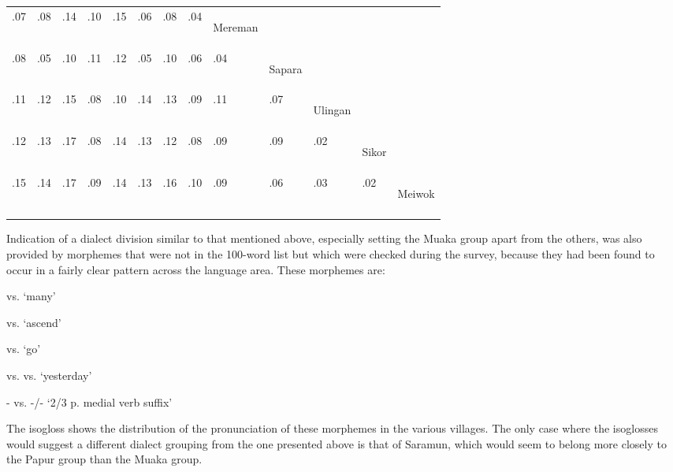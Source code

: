 \begin{table}
\begin{tabularx}{\textwidth}{lllllllllllll}
.07 & .08 & .14 & .10 & .15 & .06 & .08 & .04 &\begin{rotate}{0}{ Mereman}\end{rotate} &  &  &  & \\

.08 & .05 & .10 & .11 & .12 & .05 & .10 & .06 & .04 & \begin{rotate}{0}{Sapara}\end{rotate} &  &  & \\

.11 & .12 & .15 & .08 & .10 & .14 & .13 & .09 & .11 & .07 &\begin{rotate}{0}{ Ulingan}\end{rotate} &  & \\

.12 & .13 & .17 & .08 & .14 & .13 & .12 & .08 & .09 & .09 & .02 & \begin{rotate}{0}{Sikor}\end{rotate} & \\

.15 & .14 & .17 & .09 & .14 & .13 & .16 & .10 & .09 & .06 & .03 & .02 & \begin{rotate}{0}{Meiwok}\end{rotate}	\\
\mybottomrule
\end{tabularx}
\end{table}
 

Indication of a dialect division similar to that mentioned above, especially setting the Muaka group apart from the others, was also provided by morphemes that were not in the 100-word list but which were checked during the survey, because they had been found to occur in a fairly clear pattern across the language area. These morphemes are:

    vs.        `many'

  vs.        `ascend'

    vs.        `go'

    vs.      vs.    `yesterday'

-   vs.  -/-      `2/3 p. medial verb suffix'

The isogloss  shows the distribution of the pronunciation of these morphemes in the various villages.  The only case where the isoglosses would suggest a different dialect grouping from the one presented above is that of Saramun, which would seem to belong more closely to the Papur group than the Muaka group.



